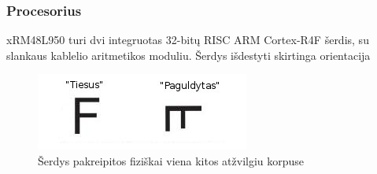 \documentclass[a4paper, 12pt]{article} %
\begin{document}
\begin{onehalfspacing}
\subsubsection{Procesorius}
xRM48L950 turi dvi integruotas 32-bit\k{u} RISC ARM Cortex-R4F \v{s}erdis, su slankaus kablelio aritmetikos moduliu. \v{S}erdys i\v{s}destyti skirtinga orientacija  
\begin{figure}[H] %
\centering %
\includegraphics[scale=2.5]{pav/orentacija.jpg} %
\captionsetup{labelformat=numbfirst} %
\captionsetup{labelseparator=tarpas}
\caption{\v{S}erdys pakreipitos fizi\v{s}kai viena kitos at\v{z}vilgiu korpuse}
\label{vienas}
\end{figure}


\end{onehalfspacing}
\end{document}
